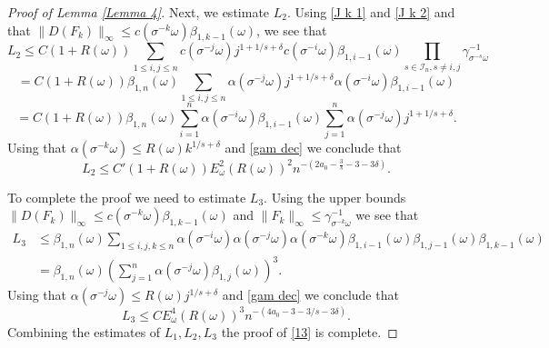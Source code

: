 \documentclass[11pt,reqno,a4paper]{article}
\theoremstyle{special}
\def\om{\omega}
\begin{document}
\begin{proof}[Proof of Lemma \ref{Lemma 4}]
Next, we estimate $L_2$. Using \eqref{J k 1} and \eqref{J k 2} and that $\|D(F_k)\|_\infty\leq c(\sigma^{-k}\om)\beta_{1,k-1}(\om)$, 
we see that 
$$
L_2\leq C(1+R(\om))\sum_{1\leq i,j\leq n}c(\sigma^{-j}\om)j^{1+1/s+\delta}c(\sigma^{-i}\om)\beta_{1,i-1} (\om)\prod_{s\in \mathcal I_n, s\not=i,j}\gamma_{\sigma^{-s}\om}^{-1}
$$
$$
=C(1+R(\om))\beta_{1,n}(\om)\sum_{1\leq i,j\leq n}\alpha(\sigma^{-j}\om)j^{1+1/s+\delta}\alpha(\sigma^{-i}\om)\beta_{1,i-1}(\om)
$$
$$
=C(1+R(\om))\beta_{1,n}(\om)\sum_{i=1}^n\alpha(\sigma^{-i}\om)\beta_{1,i-1}(\om)\sum_{j=1}^n \alpha(\sigma^{-j}\om)j^{1+1/s+\delta}.
$$
Using that $\alpha(\sigma^{-k}\om)\leq R(\om)k^{1/s+\delta}$ and \eqref{gam dec} we conclude that 
$$
L_2\leq C'(1+R(\om))E_\om^2 (R(\om))^2 n^{-(2a_0-\frac 3 s -3-3\delta)}.
$$

To complete the proof we need to estimate $L_3$. Using the upper bounds $\|D(F_k)\|_\infty\leq c(\sigma^{-k}\om)\beta_{1,k-1}(\om)$ and $\|F_k\|_\infty\leq \gamma_{\sigma^{-k}\om}^{-1}$ we see that 
\[
\begin{split}
L_3 &\leq \beta_{1,n}(\om)\sum_{1\leq i,j,k\leq n}\alpha(\sigma^{-i}\om)\alpha(\sigma^{-j}\om)\alpha(\sigma^{-k}\om)\beta_{1,i-1}(\om)\beta_{1,j-1}(\om)\beta_{1,k-1}(\om) \\
&=\beta_{1,n}(\om)\left(\sum_{j=1}^n \alpha(\sigma^{-j}\om)\beta_{1,j}(\om)\right)^3.
\end{split}
\]
Using that $\alpha(\sigma^{-j}\om)\leq R(\om)j^{1/s+\delta}$ and \eqref{gam dec} we conclude that 
$$
L_3\leq CE_\om^4(R(\om))^3 n^{-(4a_0-3-3/s-3\delta)}.
$$
Combining the estimates of $L_1,L_2,L_3$ the proof of \eqref{13} is complete.
\end{proof}
\end{document}
